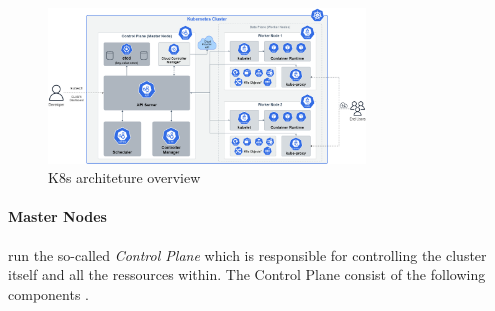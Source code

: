 \documentclass[MSC,Master,english]{twbook}%
\begin{document}
\begin{figure}[ht]
    \centering
    \includegraphics[width=0.75\textwidth]{PICs/k8s-architecture.png}
    \caption{\ac{K8s} architeture overview\cite{pic-k8s-overview}}
    \label{fig:k8s-architecture}
\end{figure}

\paragraph{Master Nodes} run the so-called \textit{Control Plane} which is responsible for controlling the cluster itself and all the ressources within. The Control Plane consist of the following components \cite{k8scomp}.
\end{document}
